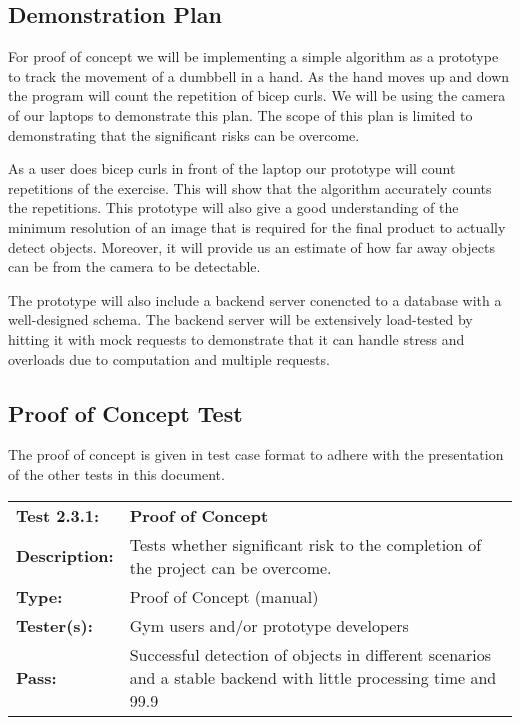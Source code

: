 \documentclass{article}
\newenvironment{testcase}
    {
    \begin{center}
    \begin{mdframed}[
        userdefinedwidth=15.5cm,
        leftmargin=1cm,
        rightmargin=1cm
        ]
    \begin{tabular}{p{2.5cm} p{9cm}}
    }
    {
    \end{tabular}
    \end{mdframed}
    \end{center}
    }
\newcommand{\tctit}[2]{\textbf{#1} & \textbf{#2}}
\newcommand{\tcdesc}{\textbf{Description:}}
\newcommand{\tctype}{\textbf{Type:}}
\newcommand{\testers}{\textbf{Tester(s):}}
\newcommand{\tcpass}{\textbf{Pass:}}
\begin{document}
\subsection{Demonstration Plan}
For proof of concept we will be implementing a simple algorithm as a prototype to track the movement of a dumbbell in a hand. As the hand moves up and down the program will count the repetition of bicep curls. We will be using the camera of our laptops to demonstrate this plan. The scope of this plan is limited to demonstrating that the significant risks can be overcome. 

As a user does bicep curls in front of the laptop our prototype will count repetitions of the exercise. This will show that the algorithm accurately counts the repetitions. This prototype will also give a good understanding of the minimum resolution of an image that is required for the final product to actually detect objects. Moreover, it will provide us an estimate of how far away objects can be from the camera to be detectable.

The prototype will also include a backend server conencted to a database with a well-designed schema. The backend server will be extensively load-tested by hitting it with mock requests to demonstrate that it can handle stress and overloads due to computation and multiple requests.

\subsection{ Proof of Concept Test}
The proof of concept is given in test case format to adhere with the presentation of the other tests in this document.
\begingroup
\begin{testcase}
    \tctit{Test 2.3.1:}{Proof of Concept} \\
    \tcdesc & Tests whether significant risk to the completion of the project can be overcome.\\
    \tctype & Proof of Concept (manual)\\
    \testers & Gym users and/or prototype developers \\
    \tcpass & Successful detection of objects in different scenarios and a stable backend with little processing time and 99.9%
\end{testcase}
\endgroup

\newpage
\end{document}
